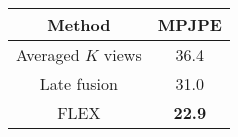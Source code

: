 \begin{center}
\begin{tabular}{|c|c|}
\hline
\textbf{Method} & \textbf{MPJPE } \\
\hline
Averaged $K$ views & 36.4 \\
\hline
Late fusion & 31.0 \\
\hline
FLEX & \textbf{22.9} \\
\hline
\end{tabular}
\end{center}
